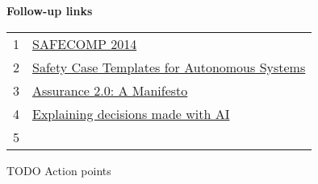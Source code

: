\textbf{Follow-up links}
\vspace{0.23cm}

\begin{tabular}{ll}
1 & \href{https://bit.ly/3AOiM43}{SAFECOMP 2014} \\
2 & \href{https://arxiv.org/abs/2102.02625}{Safety Case Templates for Autonomous Systems} \\
3 & \href{https://arxiv.org/pdf/2004.10474.pdf}{Assurance 2.0: A Manifesto} \\
4 & \href{https://ico.org.uk/for-organisations/guide-to-data-protection/key-data-protection-themes/explaining-decisions-made-with-artificial-intelligence/}{Explaining decisions made with AI} \\
5 & 





\end{tabular}

TODO Action points
